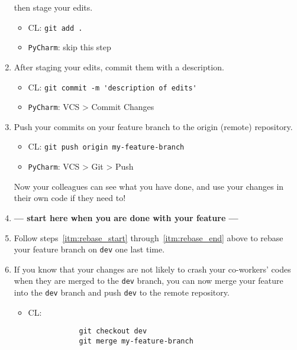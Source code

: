 \begin{enumerate}
    then stage your edits. 
    \begin{itemize} 
        \item CL: \verb|git add .| 
        \item \verb|PyCharm|: skip this step 
    \end{itemize} 
    \item After staging your edits, commit them with a description. 
    \label{itm:commitfeature} 
    \begin{itemize} 
        \item CL: \verb|git commit -m 'description of edits'| 
        \item \verb|PyCharm|: VCS > Commit Changes
    \end{itemize} 
    \item Push your commits on your feature branch to the origin (remote) repository.
    \label{itm:pushfeature} 
    \begin{itemize} 
        \item CL: \verb|git push origin my-feature-branch| 
        \item \verb|PyCharm|: VCS > Git > Push 
    \end{itemize} 
    Now your colleagues can see what you have done,
    and use your changes in their own code if they need to!
    \item \textbf{--- start here when you are done with your feature ---}
    \item Follow steps~\ref{itm:rebase_start} through~\ref{itm:rebase_end} above
    to rebase your feature branch on \verb|dev| one last time.
    \item If you know that your changes 
    are not likely to crash your co-workers' codes 
    when they are merged to the \verb|dev| branch, 
    you can now merge your feature into the \verb|dev| branch
    and push \verb|dev| to the remote repository.
    \begin{itemize} 
        \item CL: 
        \begin{lstlisting}
            git checkout dev 
            git merge my-feature-branch 

\end{lstlisting}
\end{itemize}
\end{enumerate}
